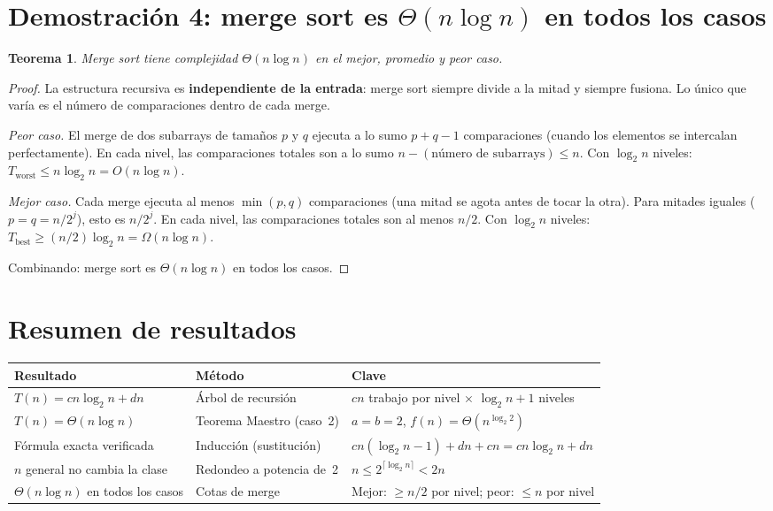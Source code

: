 \documentclass[11pt, letterpaper]{article}
\theoremstyle{definition}
\theoremstyle{plain}
\newtheorem{theorem}{Teorema}[section]
\theoremstyle{remark}
\begin{document}
\section{Demostración 4: merge sort es
  \texorpdfstring{$\Theta(n \log n)$}{Theta(n log n)} en todos los casos}

\begin{theorem}\label{thm:all-cases}
Merge sort tiene complejidad $\Theta(n \log n)$ en el mejor, promedio
y peor caso.
\end{theorem}

\begin{proof}
La estructura recursiva es \textbf{independiente de la entrada}: merge
sort siempre divide a la mitad y siempre fusiona. Lo único que varía es
el número de comparaciones dentro de cada merge.

\emph{Peor caso.} El merge de dos subarrays de tamaños $p$ y $q$
ejecuta a lo sumo $p + q - 1$ comparaciones (cuando los elementos se
intercalan perfectamente). En cada nivel, las comparaciones totales son
a lo sumo $n - (\text{número de subarrays}) \leq n$. Con $\log_2 n$
niveles: $T_{\text{worst}} \leq n \log_2 n = O(n \log n)$.

\emph{Mejor caso.} Cada merge ejecuta al menos $\min(p, q)$
comparaciones (una mitad se agota antes de tocar la otra). Para mitades
iguales ($p = q = n/2^j$), esto es $n/2^j$. En cada nivel, las
comparaciones totales son al menos $n/2$. Con $\log_2 n$ niveles:
$T_{\text{best}} \geq (n/2)\log_2 n = \Omega(n \log n)$.

Combinando: merge sort es $\Theta(n \log n)$ en todos los casos.
\end{proof}

\section{Resumen de resultados}

\begin{table}[h]
\centering
\begin{tabular}{llp{5.5cm}}
\toprule
\textbf{Resultado} & \textbf{Método} & \textbf{Clave} \\
\midrule
$T(n) = cn\log_2 n + dn$
  & Árbol de recursión
  & $cn$ trabajo por nivel $\times$ $\log_2 n + 1$ niveles \\
$T(n) = \Theta(n \log n)$
  & Teorema Maestro (caso~2)
  & $a = b = 2$, $f(n) = \Theta(n^{\log_2 2})$ \\
Fórmula exacta verificada
  & Inducción (sustitución)
  & $cn(\log_2 n {-} 1) + dn + cn = cn\log_2 n + dn$ \\
$n$ general no cambia la clase
  & Redondeo a potencia de~2
  & $n \leq 2^{\lceil \log_2 n \rceil} < 2n$ \\
$\Theta(n \log n)$ en todos los casos
  & Cotas de merge
  & Mejor: $\geq n/2$ por nivel; peor: $\leq n$ por nivel \\
\bottomrule
\end{tabular}
\end{table}
\end{document}
